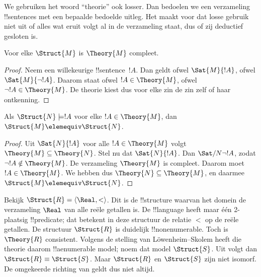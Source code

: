 \documentclass[openany]{memoir}
\begin{document}
We gebruiken het woord ``theorie'' ook losser. Dan bedoelen we een
verzameling !!{sentence}s met een bepaalde bedoelde uitleg. Het maakt
voor dat losse gebruik niet uit of alles wat eruit volgt al in de
verzameling staat, dus of zij deductief gesloten is.

\begin{prop}
Voor elke $\Struct{M}$ is $\Theory{M}$ compleet.
\end{prop}

\begin{proof}
Neem een willekeurige !!{sentence}~$!A$. Dan geldt ofwel
$\Sat{M}{!A}$, ofwel $\Sat{M}{\lnot !A}$. Daarom staat ofwel
$!A \in \Theory{M}$, ofwel $\lnot !A \in \Theory{M}$. De theorie kiest
dus voor elke zin de zin zelf of haar ontkenning.
\end{proof}

\begin{prop}
  Als $\Struct{N} \models !A$ voor elke $!A \in \Theory{M}$, dan
  $\Struct{M} \elemequiv \Struct{N}$.
\end{prop}

\begin{proof}
Uit $\Sat{N}{!A}$ voor alle $!A \in \Theory{M}$ volgt
$\Theory{M} \subseteq \Theory{N}$. Stel nu dat $\Sat{N}{!A}$. Dan
$\Sat/{N}{\lnot !A}$, zodat $\lnot !A \notin \Theory{M}$. De verzameling
$\Theory{M}$ is compleet. Daarom moet $!A \in \Theory{M}$. We hebben dus
$\Theory{N} \subseteq \Theory{M}$, en daarmee
$\Struct{M} \elemequiv \Struct{N}$.
\end{proof}

\begin{rem}
  Bekijk $\Struct{R} = \langle\Real, <\rangle$. Dit is de !!{structure}
  waarvan het domein de verzameling $\Real$ van alle reële getallen is.
  De !!{language} heeft maar één 2-plaatsig !!{predicate}; dat betekent
  in deze structuur de relatie $<$ op de reële getallen. De structuur
  $\Struct{R}$ is duidelijk !!{nonenumerable}. Toch is $\Theory{R}$
  consistent. Volgens de stelling van L\"owenheim--Skolem heeft die
  theorie daarom !!a{enumerable} model; noem dat model $\Struct{S}$.
  Uit  volgt dan $\Struct{R} \equiv \Struct{S}$.
  Maar $\Struct{R}$ en $\Struct{S}$ zijn niet isomorf. De omgekeerde
  richting van  geldt dus niet altijd.
\end{rem}
\endgroup

\begingroup
\def\olfilename{OLP-0189}
\def\olfilepath{content/model-theory/basics/}
\hypertarget{unit-OLP-0189}{}
\end{document}
